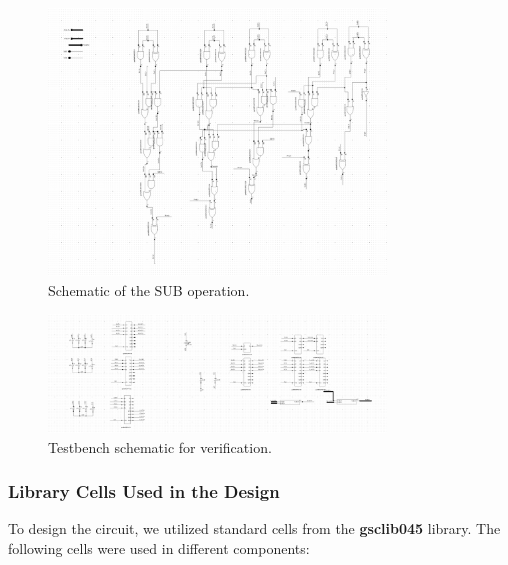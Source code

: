 \documentclass[a4paper,12pt]{article}
\begin{document}
\begin{figure}[H]
    \centering
    \includegraphics[width=0.8\textwidth]{images/SUB_schematic}
    \caption{Schematic of the SUB operation.}
\end{figure}

\begin{figure}[H]
    \centering
    \includegraphics[width=0.8\textwidth]{images/TB_schematic}
    \caption{Testbench schematic for verification.}
\end{figure}
\subsubsection{Library Cells Used in the Design}

To design the circuit, we utilized standard cells from the \textbf{gsclib045} library. The following cells were used in different components:
\end{document}
